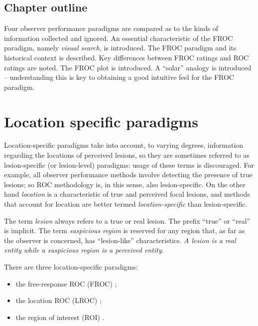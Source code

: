 \documentclass[
]{book}
\providecommand{\tightlist}{%
  \setlength{\itemsep}{0pt}\setlength{\parskip}{0pt}}
\begin{document}
\hypertarget{chapter-outline}{%
\subsection{Chapter outline}\label{chapter-outline}}

Four observer performance paradigms are compared as to the kinds of information collected and ignored. An essential characteristic of the FROC paradigm, namely \emph{visual search}, is introduced. The FROC paradigm and its historical context is described. Key differences between FROC ratings and ROC ratings are noted. The FROC plot is introduced. A ``solar'' analogy is introduced -- understanding this is key to obtaining a good intuitive feel for the FROC paradigm.

\hypertarget{location-specific-paradigms}{%
\section{Location specific paradigms}\label{location-specific-paradigms}}

Location-specific paradigms take into account, to varying degrees, information regarding the locations of perceived lesions, so they are sometimes referred to as lesion-specific (or lesion-level) paradigms: usage of these terms is discouraged. For example, all observer performance methods involve detecting the presence of true lesions; so ROC methodology is, in this sense, also lesion-specific. On the other hand \emph{location} is a characteristic of true and perceived focal lesions, and methods that account for location are better termed \emph{location-specific} than lesion-specific.

The term \emph{lesion} always refers to a true or real lesion. The prefix ``true'' or ``real'' is implicit. The term \emph{suspicious region} is reserved for any region that, as far as the observer is concerned, has ``lesion-like'' characteristics. \emph{A lesion is a real entity while a suspicious region is a perceived entity.}

There are three location-specific paradigms:

\begin{itemize}
\tightlist
\item
  the free-response ROC (FROC) \citep{bunch1977free, chakraborty1989maximum};
\item
  the location ROC (LROC) \citep{starr1977comments, swensson1996unified};
\item
  the region of interest (ROI) \citep{obuchowski2010data}.
\end{itemize}
\end{document}
